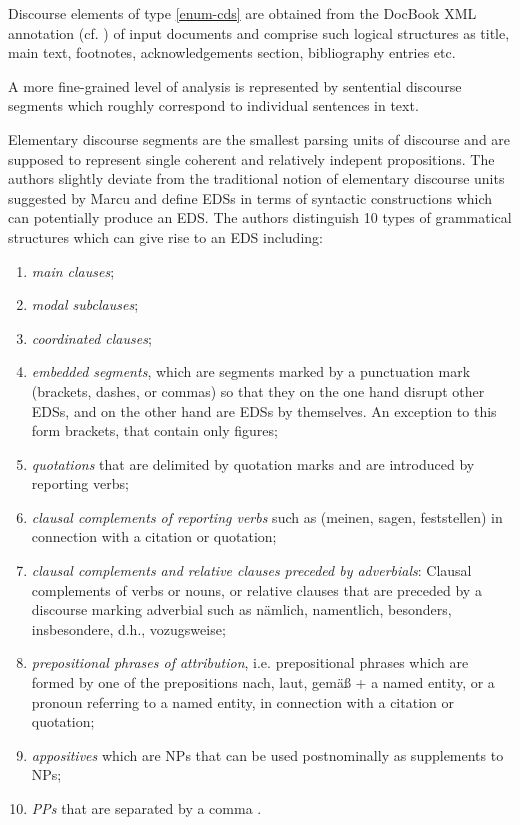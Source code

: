 \documentclass[a4paper,11pt]{article}
\begin{document}
Discourse elements of type \ref{enum-cds} are obtained from the DocBook XML
annotation (cf. \cite{Walsh-99}) of input documents and comprise such logical
structures as title, main text, footnotes, acknowledgements section,
bibliography entries etc.

A more fine-grained level of analysis is represented by sentential discourse
segments which roughly correspond to individual sentences in text.

Elementary discourse segments are the smallest parsing units of
discourse and are supposed to represent single coherent and relatively
indepent propositions.  The authors slightly deviate from the
traditional notion of elementary discourse units suggested by Marcu
\cite{Marcu-99} and define EDSs in terms of syntactic constructions
which can potentially produce an EDS.  The authors distinguish 10
types of grammatical structures which can give rise to an EDS
including:
\begin{enumerate}
  \item \textit{main clauses};
  \item \textit{modal subclauses};
  \item \textit{coordinated clauses};
  \item \textit{embedded segments}, which are segments marked by a punctuation
    mark (brackets, dashes, or commas) so that they on the one hand disrupt
    other EDSs, and on the other hand are EDSs by themselves.  An exception to
    this form brackets, that contain only figures;
  \item \textit{quotations} that are delimited by quotation marks and are
    introduced by reporting verbs;
  \item \textit{clausal complements of reporting verbs} such as (meinen,
    sagen, feststellen) in connection with a citation or quotation;
  \item \textit{clausal complements and relative clauses preceded by
    adverbials}: Clausal complements of verbs or nouns, or relative clauses
    that are preceded by a discourse marking adverbial such as n\"amlich,
    namentlich, besonders, insbesondere, d.h., vozugsweise;
  \item \textit{prepositional phrases of attribution}, i.e. prepositional
    phrases which are formed by one of the prepositions nach, laut, gem\"a\ss
    + a named entity, or a pronoun referring to a named entity, in connection
    with a citation or quotation;
  \item \textit{appositives} which are NPs that can be used postnominally as
    supplements to NPs;
  \item \textit{PPs} that are separated by a comma .
\end{enumerate}
\end{document}
